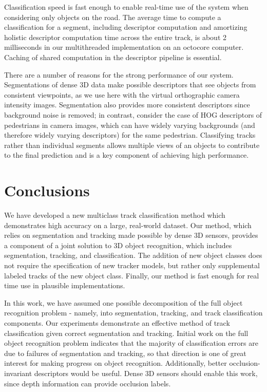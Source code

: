 \documentclass[letterpaper, 10 pt, conference]{ieeeconf}  %
\begin{document}
Classification speed is fast enough to enable real-time use of the system when considering only objects on the road.  The average time to compute a classification for a segment, including descriptor computation and amortizing holistic descriptor computation time across the entire track, is about 2 milliseconds in our multithreaded implementation on an octocore computer.  Caching of shared computation in the descriptor pipeline is essential.

There are a number of reasons for the strong performance of our system.  Segmentations of dense 3D data make possible descriptors that see objects from consistent viewpoints, as we use here with the virtual orthographic camera intensity images.  Segmentation also provides more consistent descriptors since background noise is removed; in contrast, consider the case of HOG descriptors of pedestrians in camera images, which can have widely varying backgrounds (and therefore widely varying descriptors) for the same pedestrian.  Classifying tracks rather than individual segments allows multiple views of an objects to contribute to the final prediction and is a key component of achieving high performance.





\section{Conclusions}
\label{sec:conclusions}

We have developed a new multiclass track classification method which demonstrates high accuracy on a large, real-world dataset.  Our method, which relies on segmentation and tracking made possible by dense 3D sensors, provides a component of a joint solution to 3D object recognition, which includes segmentation, tracking, and classification.  The addition of new object classes does not require the specification of new tracker models, but rather only supplemental labeled tracks of the new object class.  Finally, our method is fast enough for real time use in plausible implementations.

In this work, we have assumed one possible decomposition of the full object recognition problem - namely, into segmentation, tracking, and track classification components.  Our experiments demonstrate an effective method of track classification given correct segmentation and tracking.  Initial work on the full object recognition problem indicates that the majority of classification errors are due to failures of segmentation and tracking, so that direction is one of great interest for making progress on object recognition.  Additionally, better occlusion-invariant descriptors would be useful. Dense 3D sensors should enable this work, since depth information can provide occlusion labels.
\end{document}
